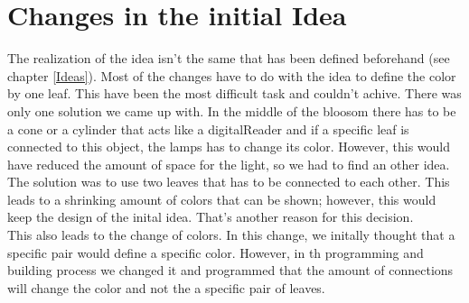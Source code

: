 \documentclass[00_doc.tex]{subfiles}
\begin{document}
    \section{Changes in the initial Idea}
    \begin{flushleft}
        The realization of the idea isn't the same that has been defined beforehand (see chapter \ref{Ideas}). 
        Most of the changes have to do with the idea to define the color by one leaf. This have been the 
        most difficult task and couldn't achive. There was only one solution we came up with. In the middle
        of the bloosom there has to be a cone or a cylinder that acts like a digitalReader and if a specific
        leaf is connected to this object, the lamps has to change its color. However, this would have 
        reduced the amount of space for the light, so we had to find an other idea. The solution was to use
        two leaves that has to be connected to each other. This leads to a shrinking amount of 
        colors that can be shown; however, this would keep the design of the inital idea. That's 
        another reason for this decision.\\

        This also leads to the change of colors. In this change, we initally thought that a specific pair 
        would define a specific color. However, in th programming and building process we changed it 
        and programmed that the amount of connections will change the color and not the a specific pair
        of leaves.        
    \end{flushleft}
\end{document}
